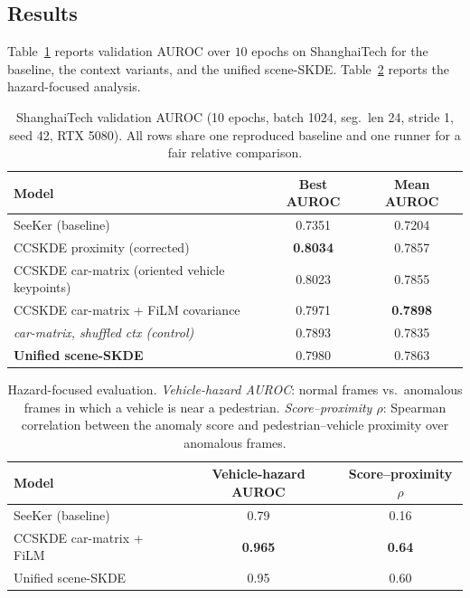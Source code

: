 \documentclass{article}
\begin{document}
\subsection{Results}

Table~\ref{tab:results} reports validation AUROC over $10$ epochs on
ShanghaiTech for the baseline, the context variants, and the unified
scene-SKDE. Table~\ref{tab:hazard} reports the hazard-focused analysis.

\begin{table}[h]
\centering
\caption{ShanghaiTech validation AUROC (10 epochs, batch 1024, seg.\ len 24,
stride 1, seed 42, RTX 5080). All rows share one reproduced baseline and one
runner for a fair relative comparison.}
\label{tab:results}
\begin{tabular}{lcc}
\toprule
Model & Best AUROC & Mean AUROC \\
\midrule
SeeKer (baseline) & 0.7351 & 0.7204 \\
CCSKDE proximity (corrected) & \textbf{0.8034} & 0.7857 \\
CCSKDE car-matrix (oriented vehicle keypoints) & 0.8023 & 0.7855 \\
CCSKDE car-matrix + FiLM covariance & 0.7971 & \textbf{0.7898} \\
\;\;\emph{car-matrix, shuffled ctx (control)} & 0.7893 & 0.7835 \\
\midrule
\textbf{Unified scene-SKDE} & 0.7980 & 0.7863 \\
\bottomrule
\end{tabular}
\end{table}

\begin{table}[h]
\centering
\caption{Hazard-focused evaluation. \emph{Vehicle-hazard AUROC}: normal frames
vs.\ anomalous frames in which a vehicle is near a pedestrian.
\emph{Score--proximity $\rho$}: Spearman correlation between the anomaly score
and pedestrian--vehicle proximity over anomalous frames.}
\label{tab:hazard}
\begin{tabular}{lcc}
\toprule
Model & Vehicle-hazard AUROC & Score--proximity $\rho$ \\
\midrule
SeeKer (baseline) & 0.79 & 0.16 \\
CCSKDE car-matrix + FiLM & \textbf{0.965} & \textbf{0.64} \\
Unified scene-SKDE & 0.95 & 0.60 \\
\bottomrule
\end{tabular}
\end{table}
\end{document}
